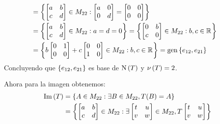 \begin{solution}
\begin{enumerate}[a)]
\begin{align*}
{			}\\
			&=\set{
				\begin{bmatrix}
					a & b\\
					c & d
				\end{bmatrix}
				\in M_{22}
				:
				\begin{bmatrix}
					a & 0\\
					0 & d
				\end{bmatrix}
				=
				\begin{bmatrix}
					0 & 0\\
					0 & 0
				\end{bmatrix}
			}\\
			&=\set{
				\begin{bmatrix}
					a & b\\
					c & d
				\end{bmatrix}
				\in M_{22}: a = d = 0
			}
			=\set{
				\begin{bmatrix}
					0 & b\\
					c & 0
				\end{bmatrix}
				\in M_{22}: b, c\in\rmath
			}\\
			&=\set{
				b
				\begin{bmatrix}
					0 & 1\\
					0 & 0
				\end{bmatrix}
				+ c
				\begin{bmatrix}
					0 & 0\\
					1 & 0
				\end{bmatrix}
				\in M_{22}: b, c\in\rmath
			}
			=\mgen[1]{\set{e_{12}, e_{21}}}
		\end{align*}
		Concluyendo que $\left\{ e_{12}, e_{21} \right\}$ es base de $\mnuc{T}$ y $\mnu{T} = 2$.\par 
		Ahora para la imagen obtenemos:
		\begin{align*}
			\mim{T} &=\set{A\in M_{22}:\exists B\in M_{22}, T(B) = A}\\
			&=\set{
				\begin{bmatrix}
					a & b\\
					c & d
				\end{bmatrix}
				\in M_{22}:
				\exists 
				\begin{bmatrix}
					t & u\\
					v & w
				\end{bmatrix}\in M_{22},
				T
				\begin{bmatrix}
					t & u\\
					v & w
				\end{bmatrix}
}
\end{align*}
\end{enumerate}
\end{solution}
